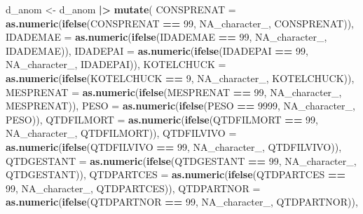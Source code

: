 \documentclass[
]{article}
\newenvironment{Shaded}{\begin{snugshade}}{\end{snugshade}}
\newcommand{\AttributeTok}[1]{\textcolor[rgb]{0.13,0.29,0.53}{#1}}
\newcommand{\ConstantTok}[1]{\textcolor[rgb]{0.56,0.35,0.01}{#1}}
\newcommand{\DecValTok}[1]{\textcolor[rgb]{0.00,0.00,0.81}{#1}}
\newcommand{\FunctionTok}[1]{\textcolor[rgb]{0.13,0.29,0.53}{\textbf{#1}}}
\newcommand{\NormalTok}[1]{#1}
\newcommand{\OtherTok}[1]{\textcolor[rgb]{0.56,0.35,0.01}{#1}}
\newcommand{\SpecialCharTok}[1]{\textcolor[rgb]{0.81,0.36,0.00}{\textbf{#1}}}
\begin{document}
\begin{Shaded}
\begin{Highlighting}[]
\NormalTok{d\_anom }\OtherTok{\textless{}{-}}\NormalTok{ d\_anom }\SpecialCharTok{|\textgreater{}}  
  \FunctionTok{mutate}\NormalTok{(}
    \AttributeTok{CONSPRENAT =} \FunctionTok{as.numeric}\NormalTok{(}\FunctionTok{ifelse}\NormalTok{(CONSPRENAT }\SpecialCharTok{==} \DecValTok{99}\NormalTok{, }\ConstantTok{NA\_character\_}\NormalTok{, CONSPRENAT)),}
    \AttributeTok{IDADEMAE =} \FunctionTok{as.numeric}\NormalTok{(}\FunctionTok{ifelse}\NormalTok{(IDADEMAE }\SpecialCharTok{==} \DecValTok{99}\NormalTok{, }\ConstantTok{NA\_character\_}\NormalTok{, IDADEMAE)),}
    \AttributeTok{IDADEPAI =} \FunctionTok{as.numeric}\NormalTok{(}\FunctionTok{ifelse}\NormalTok{(IDADEPAI }\SpecialCharTok{==} \DecValTok{99}\NormalTok{, }\ConstantTok{NA\_character\_}\NormalTok{, IDADEPAI)),}
    \AttributeTok{KOTELCHUCK =} \FunctionTok{as.numeric}\NormalTok{(}\FunctionTok{ifelse}\NormalTok{(KOTELCHUCK }\SpecialCharTok{==} \DecValTok{9}\NormalTok{, }\ConstantTok{NA\_character\_}\NormalTok{, KOTELCHUCK)),}
    \AttributeTok{MESPRENAT =} \FunctionTok{as.numeric}\NormalTok{(}\FunctionTok{ifelse}\NormalTok{(MESPRENAT }\SpecialCharTok{==} \DecValTok{99}\NormalTok{, }\ConstantTok{NA\_character\_}\NormalTok{, MESPRENAT)),}
    \AttributeTok{PESO =} \FunctionTok{as.numeric}\NormalTok{(}\FunctionTok{ifelse}\NormalTok{(PESO }\SpecialCharTok{==} \DecValTok{9999}\NormalTok{, }\ConstantTok{NA\_character\_}\NormalTok{, PESO)),}
    \AttributeTok{QTDFILMORT =} \FunctionTok{as.numeric}\NormalTok{(}\FunctionTok{ifelse}\NormalTok{(QTDFILMORT }\SpecialCharTok{==} \DecValTok{99}\NormalTok{, }\ConstantTok{NA\_character\_}\NormalTok{, QTDFILMORT)),}
    \AttributeTok{QTDFILVIVO =} \FunctionTok{as.numeric}\NormalTok{(}\FunctionTok{ifelse}\NormalTok{(QTDFILVIVO }\SpecialCharTok{==} \DecValTok{99}\NormalTok{, }\ConstantTok{NA\_character\_}\NormalTok{, QTDFILVIVO)),}
    \AttributeTok{QTDGESTANT =} \FunctionTok{as.numeric}\NormalTok{(}\FunctionTok{ifelse}\NormalTok{(QTDGESTANT }\SpecialCharTok{==} \DecValTok{99}\NormalTok{, }\ConstantTok{NA\_character\_}\NormalTok{, QTDGESTANT)),}
    \AttributeTok{QTDPARTCES =} \FunctionTok{as.numeric}\NormalTok{(}\FunctionTok{ifelse}\NormalTok{(QTDPARTCES }\SpecialCharTok{==} \DecValTok{99}\NormalTok{, }\ConstantTok{NA\_character\_}\NormalTok{, QTDPARTCES)),}
    \AttributeTok{QTDPARTNOR =} \FunctionTok{as.numeric}\NormalTok{(}\FunctionTok{ifelse}\NormalTok{(QTDPARTNOR }\SpecialCharTok{==} \DecValTok{99}\NormalTok{, }\ConstantTok{NA\_character\_}\NormalTok{, QTDPARTNOR)),}

\end{Highlighting}
\end{Shaded}
\end{document}
